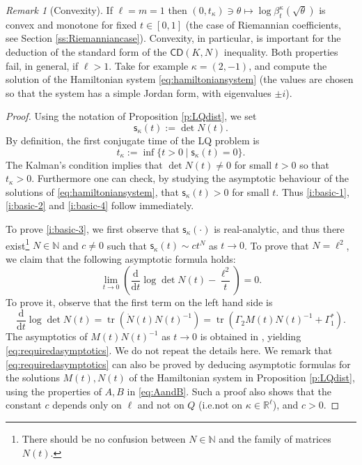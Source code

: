 \documentclass[11pt,a4paper]{article}
\theoremstyle{plain}
\theoremstyle{definition}
\theoremstyle{remark}
\newtheorem{remark}[theorem]{Remark}
\numberwithin{equation}{section}
\newcommand{\R}{\mathbb{R}} %
\newcommand{\N}{\mathbb{N}} %
\newcommand{\CD}{\mathsf{CD}}
\newcommand{\sfs}{\mathsf{s}}
\DeclareMathOperator{\tr}{\mathrm{tr}}
\newcommand{\di}{\mathrm{d}}
\begin{document}
\begin{remark}[Convexity]
If $\ell=m=1$ then $(0,t_\kappa)\ni \theta\mapsto \log\beta_t^{\kappa}(\sqrt{\theta})$ is convex and monotone for fixed $t \in [0,1]$ (the case of Riemannian coefficients, see Section \ref{ss:Riemanniancase}). Convexity, in particular, is important for the deduction of the standard form of the $\CD(K,N)$ inequality. Both properties fail, in general, if $\ell > 1$. Take for example $\kappa = (2, -1)$, and compute the solution of the Hamiltonian system \eqref{eq:hamiltoniansystem} (the values are chosen so that the system has a simple Jordan form, with eigenvalues $\pm i$).
\end{remark}

\begin{proof}
Using the notation of Proposition \ref{p:LQdist}, we set
\begin{equation}
\sfs_\kappa(t) := \det N(t).
\end{equation}
By definition, the first conjugate time of the LQ problem is 
\begin{equation}
t_\kappa :=\inf\{t>0 \mid \sfs_\kappa(t) =0\}.
\end{equation}
The Kalman's condition implies that $\det N(t)\neq 0$ for small $t>0$ so that $t_\kappa >0$. Furthermore one can check, by studying the asymptotic behaviour of the solutions of \eqref{eq:hamiltoniansystem}, that $\sfs_\kappa(t)>0$ for small $t$. Thus \ref{i:basic-1}, \ref{i:basic-2} and \ref{i:basic-4} follow immediately.

To prove \ref{i:basic-3}, we first observe that $\sfs_\kappa(\cdot)$ is real-analytic, and thus there exist\footnote{There should be no confusion between $N\in \mathbb N$ and the family of matrices $N(t)$.} $N\in \N$ and $c \neq 0$ such that $\sfs_\kappa(t) \sim c t^N$ as $t\to 0$. To prove that $N=\ell^2$, we claim that the following asymptotic formula holds:
\begin{equation}\label{eq:requiredasymptotics}
\lim_{t\to 0} \left(\frac{\di}{\di t}\log\det N(t) - \frac{\ell^2}{t}\right) = 0.
\end{equation}
To prove it, observe that the first term on the left hand side is
\begin{equation}
\frac{\di}{\di t}\log\det N(t)= \tr(\dot{N}(t) N(t)^{-1}) = \tr(\Gamma_2 M(t)N(t)^{-1} + \Gamma_1^*).
\end{equation}
The asymptotics of $M(t)N(t)^{-1}$ as $t\to 0$ is obtained in \cite[Thm.\@ 7.4 and Cor.\ 7.5]{ABR-curvature}, yielding \eqref{eq:requiredasymptotics}. We do not repeat the details here. We remark that \eqref{eq:requiredasymptotics} can also be proved by deducing asymptotic formulas for the solutions $M(t),N(t)$ of the Hamiltonian system in Proposition \ref{p:LQdist}, using the properties of $A,B$ in \eqref{eq:AandB}. Such a proof also shows that the constant $c$ depends only on $\ell$ and not on $Q$ (i.e.\@ not on $\kappa\in\R^\ell$), and $c >0$.


\end{proof}
\end{document}
